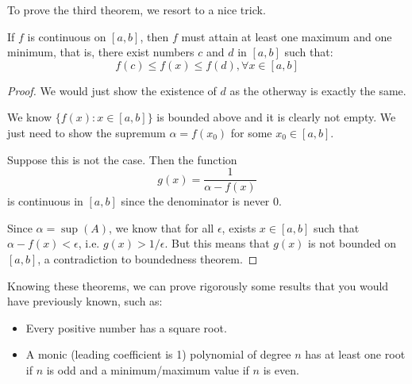 \documentclass[11pt]{article}
\begin{document}
To prove the third theorem, we resort to a nice trick.
\begin{theorem}
  If \(f\) is continuous on \([a,b]\), then \(f\) must attain at least one maximum and one minimum, that is, there exist numbers \(c\) and \(d\) in \([a,b]\) such that:
  \[f(c)\leq f(x) \leq f(d), \forall x\in[a,b]\]
\end{theorem}
\begin{proof}
  We would just show the existence of \(d\) as the otherway is exactly the same.

  We know \(\{f(x):x\in[a,b]\}\) is bounded above and it is clearly not empty. We just need to show the supremum \(\alpha=f(x_0)\) for some \(x_0\in[a,b]\).
  
  Suppose this is not the case. Then the function
  \[g(x)=\frac{1}{\alpha-f(x)}\]
  is continuous in \([a,b]\) since the denominator is never \(0\). 

  Since \(\alpha=\sup(A)\), we know that for all \(\epsilon\), exists \(x\in[a,b]\) such that \(\alpha-f(x)<\epsilon\), i.e. \(g(x)>1/\epsilon\). But this means that \(g(x)\) is not bounded on \([a,b]\), a contradiction to boundedness theorem.
\end{proof}

Knowing these theorems, we can prove rigorously some results that you would have previously known, such as:
\begin{itemize}
  \item Every positive number has a square root.
  \item A monic (leading coefficient is 1) polynomial of degree \(n\) has at least one root if \(n\) is odd and a minimum/maximum value if \(n\) is even.
\end{itemize}
\end{document}
